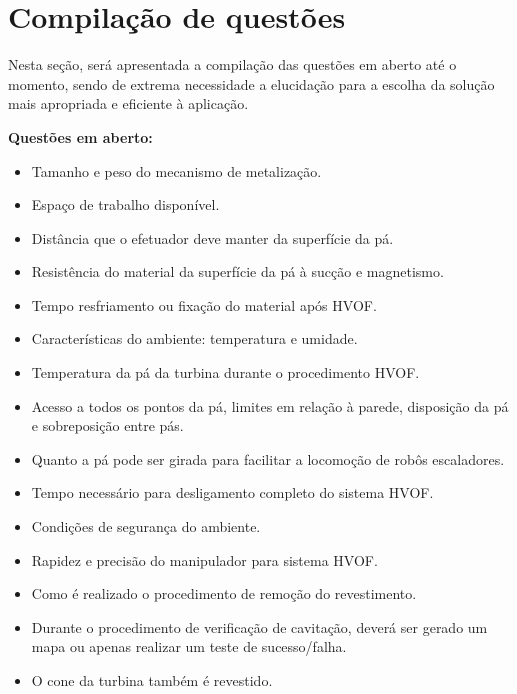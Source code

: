 \section{Compilação de questões}\label{sec:questoes}
Nesta seção, será apresentada a compilação das questões em aberto até o momento,
sendo de extrema necessidade a elucidação para a escolha da solução mais
apropriada e eficiente à aplicação.

\textbf{Questões em aberto:}
\begin{itemize}
	\item Tamanho e peso do mecanismo de metalização. 
	\item Espaço de trabalho disponível.
	\item Distância que o efetuador deve manter da superfície da pá.
	\item Resistência do material da superfície da pá à sucção e magnetismo.
	\item Tempo resfriamento ou fixação do material após HVOF.
	\item Características do ambiente: temperatura e umidade.
	\item Temperatura da pá da turbina durante o procedimento HVOF.
	\item Acesso a todos os pontos da pá, limites em relação à parede, disposição
	da pá e sobreposição entre pás.
	\item Quanto a pá pode ser girada para facilitar a locomoção de robôs
	escaladores.
	\item Tempo necessário para desligamento completo do sistema HVOF.
	\item Condições de segurança do ambiente.
	\item Rapidez e precisão do manipulador para sistema HVOF.
	\item Como é realizado o procedimento de remoção do revestimento.
	\item Durante o procedimento de verificação de cavitação, deverá ser gerado um
	mapa ou apenas realizar um teste de sucesso/falha.
	\item O cone da turbina também é revestido.
\end{itemize}



